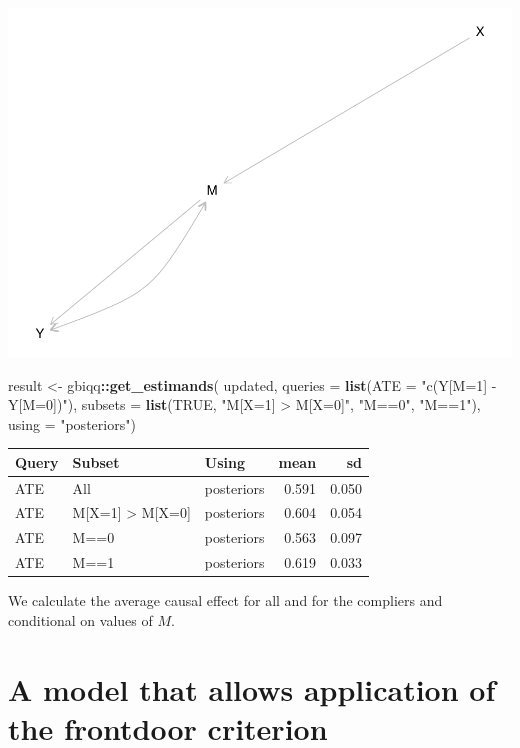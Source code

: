 \documentclass[12pt,]{book}
\newenvironment{Shaded}{\begin{snugshade}}{\end{snugshade}}
\newcommand{\DataTypeTok}[1]{\textcolor[rgb]{0.13,0.29,0.53}{#1}}
\newcommand{\KeywordTok}[1]{\textcolor[rgb]{0.13,0.29,0.53}{\textbf{#1}}}
\newcommand{\NormalTok}[1]{#1}
\newcommand{\OperatorTok}[1]{\textcolor[rgb]{0.81,0.36,0.00}{\textbf{#1}}}
\newcommand{\OtherTok}[1]{\textcolor[rgb]{0.56,0.35,0.01}{#1}}
\newcommand{\StringTok}[1]{\textcolor[rgb]{0.31,0.60,0.02}{#1}}
\begin{document}
\includegraphics{ii_files/figure-latex/unnamed-chunk-124-1.pdf}

\begin{Shaded}
\begin{Highlighting}[]
\NormalTok{result <-}\StringTok{ }\NormalTok{gbiqq}\OperatorTok{::}\KeywordTok{get_estimands}\NormalTok{(}
\NormalTok{    updated, }
    \DataTypeTok{queries =} \KeywordTok{list}\NormalTok{(}\DataTypeTok{ATE =} \StringTok{"c(Y[M=1] - Y[M=0])"}\NormalTok{), }
    \DataTypeTok{subsets =} \KeywordTok{list}\NormalTok{(}\OtherTok{TRUE}\NormalTok{, }\StringTok{"M[X=1] > M[X=0]"}\NormalTok{,  }\StringTok{"M==0"}\NormalTok{,  }\StringTok{"M==1"}\NormalTok{),}
    \DataTypeTok{using =} \StringTok{"posteriors"}\NormalTok{)}
\end{Highlighting}
\end{Shaded}

\begin{tabular}{l|l|l|r|r}
\hline
Query & Subset & Using & mean & sd\\
\hline
ATE & All & posteriors & 0.591 & 0.050\\
\hline
ATE & M[X=1] > M[X=0] & posteriors & 0.604 & 0.054\\
\hline
ATE & M==0 & posteriors & 0.563 & 0.097\\
\hline
ATE & M==1 & posteriors & 0.619 & 0.033\\
\hline
\end{tabular}

We calculate the average causal effect for all and for the compliers and conditional on values of \(M\).

\hypertarget{a-model-that-allows-application-of-the-frontdoor-criterion}{%
\section{A model that allows application of the frontdoor criterion}\label{a-model-that-allows-application-of-the-frontdoor-criterion}}
\end{document}
